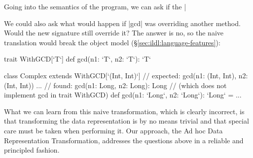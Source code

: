 Going into the semantics of the program, we can ask if the |%

We could also ask what would happen if |gcd| was overriding another method. Would the new signature still override it? The answer is no, so the naive translation would break the object model (\S\ref{sec:ildl:language-features}):

\begin{lstlisting-nobreak}
trait WithGCD[`T`] {
  def gcd(n1: `T`, n2: `T`): `T`
}

class Complex extends WithGCD[`(Int, Int)`] {
  // expected: gcd(n1: (Int, Int), n2: (Int, Int)) ...
  // found:    gcd(n1: Long, n2: Long): Long
  // (which does not implement gcd in trait WithGCD)
  def gcd(n1: `Long`, n2: `Long`): `Long` = ...
}
\end{lstlisting-nobreak}

What we can learn from this naive transformation, which is clearly incorrect, is that transforming the data representation is by no means trivial and that special care must be taken when performing it. Our approach, the Ad hoc Data Representation Transformation, addresses the questions above in a reliable and principled fashion.

